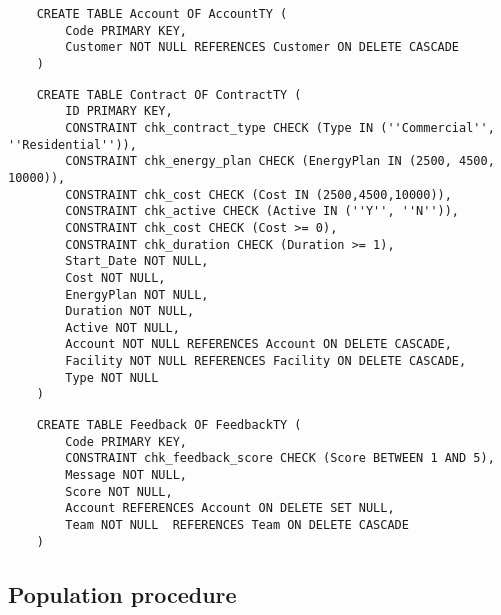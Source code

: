 \begin{lstlisting}
    CREATE TABLE Account OF AccountTY (
        Code PRIMARY KEY,
        Customer NOT NULL REFERENCES Customer ON DELETE CASCADE
    )
\end{lstlisting}


\begin{lstlisting}
    CREATE TABLE Contract OF ContractTY (
        ID PRIMARY KEY,
        CONSTRAINT chk_contract_type CHECK (Type IN (''Commercial'', ''Residential'')),
        CONSTRAINT chk_energy_plan CHECK (EnergyPlan IN (2500, 4500, 10000)),
        CONSTRAINT chk_cost CHECK (Cost IN (2500,4500,10000)),
        CONSTRAINT chk_active CHECK (Active IN (''Y'', ''N'')),
        CONSTRAINT chk_cost CHECK (Cost >= 0),
        CONSTRAINT chk_duration CHECK (Duration >= 1),
        Start_Date NOT NULL,
        Cost NOT NULL,
        EnergyPlan NOT NULL,
        Duration NOT NULL,
        Active NOT NULL,
        Account NOT NULL REFERENCES Account ON DELETE CASCADE,
        Facility NOT NULL REFERENCES Facility ON DELETE CASCADE,
        Type NOT NULL
    )
\end{lstlisting}


\begin{lstlisting}
    CREATE TABLE Feedback OF FeedbackTY (
        Code PRIMARY KEY,
        CONSTRAINT chk_feedback_score CHECK (Score BETWEEN 1 AND 5),
        Message NOT NULL,
        Score NOT NULL,
        Account REFERENCES Account ON DELETE SET NULL,
        Team NOT NULL  REFERENCES Team ON DELETE CASCADE
    )
\end{lstlisting}

\subsection{Population procedure}

